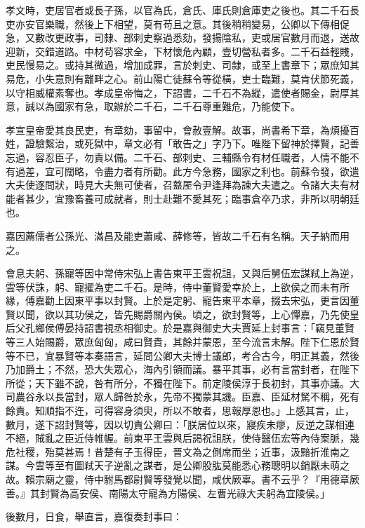 \begin{pinyinscope}
孝文時，吏居官者或長子孫，以官為氏，倉氏、庫氏則倉庫吏之後也。其二千石長吏亦安官樂職，然後上下相望，莫有苟且之意。其後稍稍變易，公卿以下傳相促急，又數改更政事，司隸、部刺史察過悉劾，發揚陰私，吏或居官數月而退，送故迎新，交錯道路。中材苟容求全，下材懷危內顧，壹切營私者多。二千石益輕賤，吏民慢易之。或持其微過，增加成罪，言於刺史、司隸，或至上書章下；眾庶知其易危，小失意則有離畔之心。前山陽亡徒蘇令等從橫，吏士臨難，莫肯伏節死義，以守相威權素奪也。孝成皇帝悔之，下詔書，二千石不為縱，遣使者賜金，尉厚其意，誠以為國家有急，取辦於二千石，二千石尊重難危，乃能使下。

孝宣皇帝愛其良民吏，有章劾，事留中，會赦壹解。故事，尚書希下章，為煩擾百姓，證驗繫治，或死獄中，章文必有「敢告之」字乃下。唯陛下留神於擇賢，記善忘過，容忍臣子，勿責以備。二千石、部刺史、三輔縣令有材任職者，人情不能不有過差，宜可闊略，令盡力者有所勸。此方今急務，國家之利也。前蘇令發，欲遣大夫使逐問狀，時見大夫無可使者，召盩厔令尹逢拜為諫大夫遣之。令諸大夫有材能者甚少，宜豫畜養可成就者，則士赴難不愛其死；臨事倉卒乃求，非所以明朝廷也。

嘉因薦儒者公孫光、滿昌及能吏蕭咸、薛修等，皆故二千石有名稱。天子納而用之。

會息夫躬、孫寵等因中常侍宋弘上書告東平王雲祝詛，又與后舅伍宏謀弒上為逆，雲等伏誅，躬、寵擢為吏二千石。是時，侍中董賢愛幸於上，上欲侯之而未有所緣，傅嘉勸上因東平事以封賢。上於是定躬、寵告東平本章，掇去宋弘，更言因董賢以聞，欲以其功侯之，皆先賜爵關內侯。頃之，欲封賢等，上心憚嘉，乃先使皇后父孔鄉侯傅晏持詔書視丞相御史。於是嘉與御史大夫賈延上封事言：「竊見董賢等三人始賜爵，眾庶匈匈，咸曰賢貴，其餘并蒙恩，至今流言未解。陛下仁恩於賢等不已，宜暴賢等本奏語言，延問公卿大夫博士議郎，考合古今，明正其義，然後乃加爵土；不然，恐大失眾心，海內引領而議。暴平其事，必有言當封者，在陛下所從；天下雖不說，咎有所分，不獨在陛下。前定陵侯淳于長初封，其事亦議。大司農谷永以長當封，眾人歸咎於永，先帝不獨蒙其譏。臣嘉、臣延材駑不稱，死有餘責。知順指不迕，可得容身須臾，所以不敢者，思報厚恩也。」上感其言，止，數月，遂下詔封賢等，因以切責公卿曰：「朕居位以來，寢疾未瘳，反逆之謀相連不絕，賊亂之臣近侍帷幄。前東平王雲與后謁祝詛朕，使侍醫伍宏等內侍案脈，幾危社稷，殆莫甚焉！昔楚有子玉得臣，晉文為之側席而坐；近事，汲黯折淮南之謀。今雲等至有圖弒天子逆亂之謀者，是公卿股肱莫能悉心務聰明以銷厭未萌之故。賴宗廟之靈，侍中駙馬都尉賢等發覺以聞，咸伏厥辜。書不云乎？『用德章厥善。』其封賢為高安侯、南陽太守寵為方陽侯、左曹光祿大夫躬為宜陵侯。」

後數月，日食，舉直言，嘉復奏封事曰：


\end{pinyinscope}
